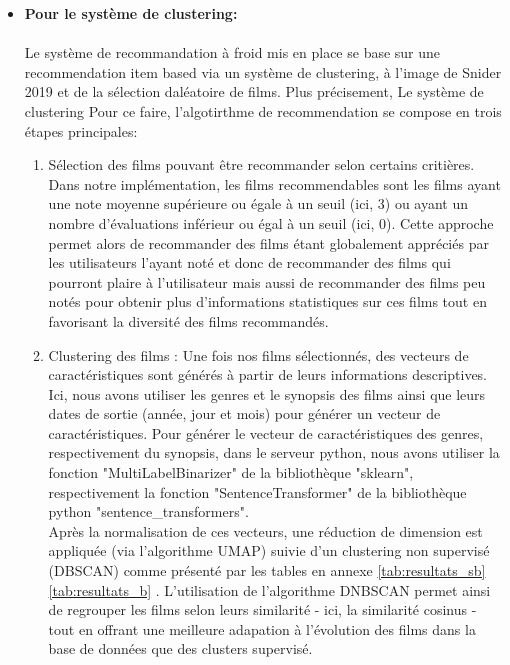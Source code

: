 \documentclass{article}
\begin{document}
\begin{itemize}
    \item \textbf{Pour le système de clustering:}\\
          $ $\\
          Le système de recommandation à froid mis en place se base sur une recommendation item based via un système de clustering, à l'image de Snider 2019 \cite{snider_unsupervised} et de la sélection daléatoire de films.
          Plus précisement, Le système de clustering
          Pour ce faire, l'algotirthme de recommendation se compose en trois étapes principales:\\
          \begin{enumerate}
              \item Sélection des films pouvant être recommander selon certains critières. Dans notre implémentation, les films recommendables sont les films ayant une note moyenne supérieure ou égale à un seuil (ici, 3) ou
                    ayant un nombre d’évaluations inférieur ou égal à un seuil (ici, 0). Cette approche permet alors de recommander des films étant globalement appréciés par les utilisateurs l'ayant noté et donc de recommander des films qui
                    pourront plaire à l'utilisateur mais aussi de recommander des films peu notés pour obtenir plus d'informations statistiques sur ces films tout en favorisant la diversité des films recommandés.
              \item Clustering des films : Une fois nos films sélectionnés, des vecteurs de caractéristiques sont générés à partir de leurs informations descriptives. Ici, nous avons utiliser les genres et le synopsis des films ainsi que leurs dates de
                    sortie (année, jour et mois) pour générer un vecteur de caractéristiques. Pour générer le vecteur de caractéristiques des genres, respectivement du synopsis, dans le serveur python, nous avons utiliser la fonction "MultiLabelBinarizer" de
                    la bibliothèque "sklearn", respectivement la fonction "SentenceTransformer" de la bibliothèque python "sentence\_transformers".\\
                    Après la normalisation de ces vecteurs, une réduction de dimension est appliquée (via l’algorithme UMAP) suivie d’un clustering non supervisé (DBSCAN) comme présenté par les tables en annexe \ref{tab:resultats_sb} \ref{tab:resultats_b} . L'utilisation de l'algorithme DNBSCAN permet ainsi de regrouper
                    les films selon leurs similarité - ici, la similarité cosinus - tout en offrant une meilleure adapation à l'évolution des films dans la base de données que des clusters supervisé.

\end{enumerate}
\end{itemize}
\end{document}
